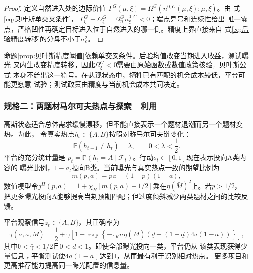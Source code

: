 \documentclass[UTF8, a4paper, 12pt, fontset=fandol]{ctexart}
\theoremstyle{definition}
\theoremstyle{remark}
\newcommand{\Prb}{\mathbb{P}}
\begin{document}
\begin{proof}
  定义自然进入处的边际价值
  $\Gamma^G(\mu,\xi)=\Omega^G(n^{0,G}(\mu,\xi);\mu,\xi)$。由
  式\eqref{eq:贝叶斯单交叉条件}，
  $\Gamma_\xi^G=\Omega_\xi^G+\Omega_n^G n_\xi^{0,G}<0$；端点异号和连续性给出
  唯一零点，严格凹性再确定目标进入位于自然进入的哪一侧。精度上界直接来自
  式\eqref{eq:后验精度转移}的分母不小于$\sigma_\varepsilon^2$。
\end{proof}

命题\ref{prop:贝叶斯精度阈值}依赖单交叉条件。后验均值改变当期进入收益，测试曝光
又内生改变精度转移，因此$\Omega_\xi^G<0$需要由原始函数或数值政策核验，贝叶斯公式
本身不给出这一符号。在悲观状态中，牺牲已有匹配的机会成本较低，平台可能更愿意
试验；测试政策由精度与当前机会成本共同决定。

\subsubsection{规格二：两题材马尔可夫热点与探索---利用}

高斯状态适合总体需求缓慢漂移，但不能直接表示一个题材退潮而另一个题材变热。为此，
令真实热点$h_t\in\{A,B\}$按照对称马尔可夫链变化：
\begin{equation}
  \Prb(h_{t+1}\neq h_t)=\lambda,
  \qquad 0<\lambda<\frac12.
  \label{eq:热点切换}
\end{equation}
平台的充分统计量是
$p_t=\Prb(h_t=A\mid\mathcal F_t)$。行动$a_t\in[0,1]$现在表示投向A类内容的
曝光比例，$1-a_t$投向B类。当前曝光与真实热点一致的期望比例为
\begin{equation}
  m(p,a)=pa+(1-p)(1-a),
  \label{eq:热点匹配概率}
\end{equation}
数值模型令$g^H(p,a)=1+\chi_H[m(p,a)-1/2]$乘在$\eta(\bar M)^2$上。若$p>1/2$，
把更多曝光投向A能够提高当期预期匹配；但过度倾斜减少两类题材之间的比较反馈。

平台观察信号$z_t\in\{A,B\}$，其正确率为
\begin{equation}
  \gamma(n,a;\bar M)
  =\frac12+\bar\gamma\left[1-\exp\left\{-\tau_Hn\eta(\bar M)
  \left(\underline d+(1-\underline d)4a(1-a)\right)\right\}\right],
  \label{eq:热点信号正确率}
\end{equation}
其中$0<\bar\gamma<1/2$且$0<\underline d<1$。即使全部曝光投向一类，平台仍从
该类表现获得少量信息；平衡测试使$4a(1-a)$达到1，从而最有利于识别相对热点。
更多项目和更高推荐能力提高同一曝光配置的信息量。
\end{document}
